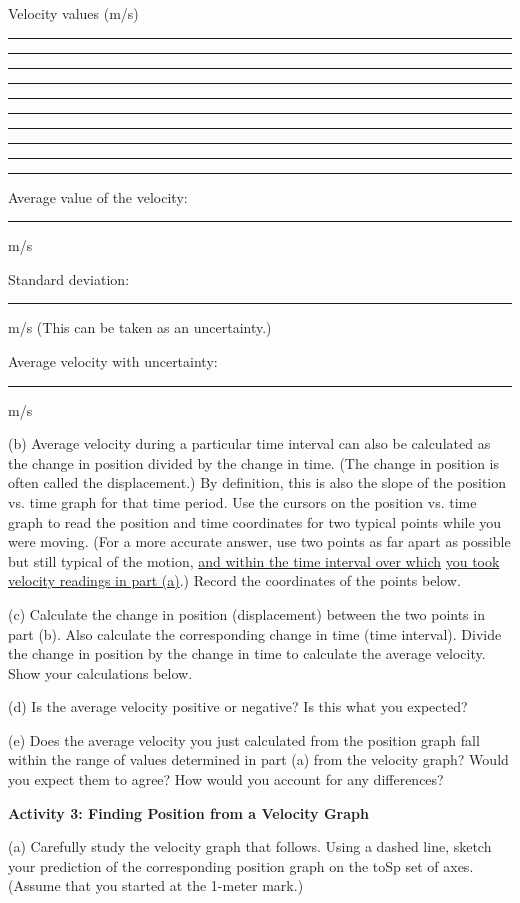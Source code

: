 Velocity values (m/s) \rule{0.5in}{0.1pt} \rule{0.5in}{0.1pt} \rule{0.5in}{0.1pt} \rule{0.5in}{0.1pt} \rule{0.5in}{0.1pt} \rule{0.5in}{0.1pt} \rule{0.5in}{0.1pt} \rule{0.5in}{0.1pt} \rule{0.5in}{0.1pt} \rule{0.5in}{0.1pt}
\answerspace{5mm}

Average value of the velocity: \rule{1.0in}{0.1pt} m/s

Standard deviation: \rule{1.0in}{0.1pt} m/s     (This can be taken as an uncertainty.)

Average velocity with uncertainty: \rule{1.5in}{0.1pt} m/s
\answerspace{10mm}

(b) Average velocity during a particular time interval can also be calculated
as the change in position divided by the change in time. (The change in position
is often called the displacement.) By definition, this is also the slope of
the position vs. time graph for that time period. Use the cursors on the position
vs. time graph to read the position and time coordinates for two typical points
while you were moving. (For a more accurate answer, use two points as far apart
as possible but still typical of the motion, \underline{and within the time 
interval over which} \underline{you took velocity readings in part (a)}.) 
Record the coordinates of the points below.
\answerspace{10mm}

(c) Calculate the change in position (displacement) between the two points in
part (b). Also calculate the corresponding change in time (time interval). Divide the change in position by the change in time to calculate the average velocity.  Show your calculations below.
\answerspace{20mm}

(d) Is the average velocity positive or negative? Is this what you expected? 
\answerspace{20mm}

\pagebreak[2]
(e) Does the average velocity you just calculated from the position graph fall within the range of values determined in part (a) from the velocity graph? Would you expect them to agree? How would you account for any differences?
\vspace{20mm}

\textbf{Activity 3: Finding Position from a Velocity Graph }

(a) Carefully study the velocity graph that follows. Using a dashed line, sketch your prediction of the corresponding position graph on the toSp set of axes.
(Assume that you started at the 1-meter mark.)

